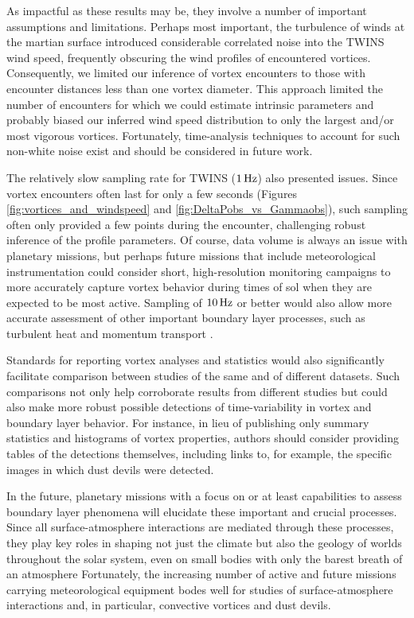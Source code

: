 \documentclass[linenumbers,trackchanges]{aastex63}
\begin{document}
As impactful as these results may be, they involve a number of important assumptions and limitations. Perhaps most important, the turbulence of winds at the martian surface introduced considerable correlated noise \citep[\emph{cf.}][]{2018RemS...10...65J} into the TWINS wind speed, frequently obscuring the wind profiles of encountered vortices. Consequently, we limited our inference of vortex encounters to those with encounter distances less than one vortex diameter. This approach limited the number of encounters for which we could estimate intrinsic parameters and probably biased our inferred wind speed distribution to only the largest and/or most vigorous vortices. Fortunately, time-analysis techniques to account for such non-white noise exist \citep{hodlr} and should be considered in future work. 

The relatively slow sampling rate for TWINS ($1\,{\rm Hz}$) also presented issues. Since vortex encounters often last for only a few seconds (Figures \ref{fig:vortices_and_windspeed} and \ref{fig:DeltaPobs_vs_Gammaobs}), such sampling often only provided a few points during the encounter, challenging robust inference of the profile parameters. Of course, data volume is always an issue with planetary missions, but perhaps future missions that include meteorological instrumentation could consider short, high-resolution monitoring campaigns to more accurately capture vortex behavior during times of sol when they are expected to be most active. Sampling of $10\,{\rm Hz}$ or better would also allow more accurate assessment of other important boundary layer processes, such as turbulent heat and momentum transport \citep{2011RvGeo..49.3005P}.

Standards for reporting vortex analyses and statistics would also significantly facilitate comparison between studies of the same and of different datasets. Such comparisons not only help corroborate results from different studies but could also make more robust possible detections of time-variability in vortex and boundary layer behavior. For instance, in lieu of publishing only summary statistics and histograms of vortex properties, authors should consider providing tables of the detections themselves, including links to, for example, the specific images in which dust devils were detected.

In the future, planetary missions with a focus on or at least capabilities to assess boundary layer phenomena will elucidate these important and crucial processes. Since all surface-atmosphere interactions are mediated through these processes, they play key roles in shaping not just the climate but also the geology of worlds throughout the solar system, even on small bodies with only the barest breath of an atmosphere \citep{2017PNAS..114.2509J} Fortunately, the increasing number of active and future missions carrying meteorological equipment bodes well for studies of surface-atmosphere interactions and, in particular, convective vortices and dust devils. 
\end{document}
